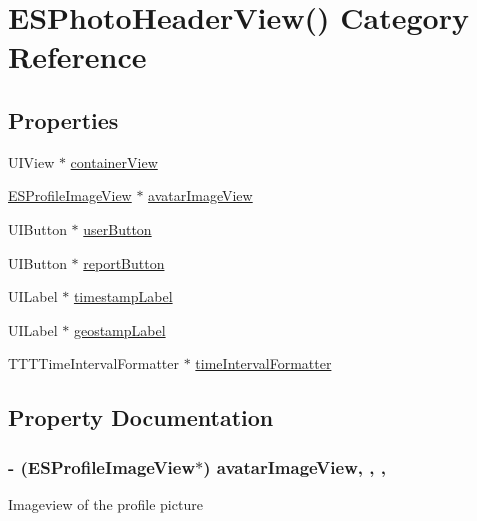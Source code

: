 \hypertarget{category_e_s_photo_header_view_07_08}{}\section{E\+S\+Photo\+Header\+View() Category Reference}
\label{category_e_s_photo_header_view_07_08}
\subsection*{Properties}
\begin{DoxyCompactItemize}
\item 
U\+I\+View $\ast$ \hyperlink{category_e_s_photo_header_view_07_08_ad0a40fb661c1afa19f9f9899bdd7b57b}{container\+View}
\item 
\hyperlink{interface_e_s_profile_image_view}{E\+S\+Profile\+Image\+View} $\ast$ \hyperlink{category_e_s_photo_header_view_07_08_ac5e93e3cdcd8ac0ac1626c62b676f5c9}{avatar\+Image\+View}
\item 
U\+I\+Button $\ast$ \hyperlink{category_e_s_photo_header_view_07_08_a47115a5bbaac43864584552b5c4a7085}{user\+Button}
\item 
U\+I\+Button $\ast$ \hyperlink{category_e_s_photo_header_view_07_08_a04b87bebee468df2573aef2709e56c5e}{report\+Button}
\item 
U\+I\+Label $\ast$ \hyperlink{category_e_s_photo_header_view_07_08_a9e9e377aec46d409e2dc1bb144d20cc4}{timestamp\+Label}
\item 
U\+I\+Label $\ast$ \hyperlink{category_e_s_photo_header_view_07_08_ad742bec5034c1f062fde5a5b8a053556}{geostamp\+Label}
\item 
T\+T\+T\+Time\+Interval\+Formatter $\ast$ \hyperlink{category_e_s_photo_header_view_07_08_a41b96cf21dece233aa8bb3a6602376e8}{time\+Interval\+Formatter}
\end{DoxyCompactItemize}


\subsection{Property Documentation}
\hypertarget{category_e_s_photo_header_view_07_08_ac5e93e3cdcd8ac0ac1626c62b676f5c9}{}
\subsubsection[{avatar\+Image\+View}]{\setlength{\rightskip}{0pt plus 5cm}-\/ ({\bf E\+S\+Profile\+Image\+View}$\ast$) avatar\+Image\+View\hspace{0.3cm}{\ttfamily [read]}, {\ttfamily [write]}, {\ttfamily [nonatomic]}, {\ttfamily [strong]}}\label{category_e_s_photo_header_view_07_08_ac5e93e3cdcd8ac0ac1626c62b676f5c9}
Imageview of the profile picture \hypertarget{category_e_s_photo_header_view_07_08_ad0a40fb661c1afa19f9f9899bdd7b57b}{}
